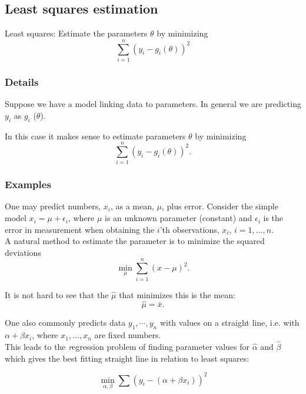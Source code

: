 \documentclass[12pt,a4paper]{article}
\theoremstyle{regla}
\theoremstyle{remark}
\theoremstyle{definition}
\theoremstyle{nonumberbreak}
\begin{document}
\subsection{Least squares estimation}
\begin{fbox}
\begin{minipage}{0.97\textwidth}
Least squares:  Estimate the parameters $\theta$ by minimizing 
$$
\sum_{i=1}^{n}{(y_i - g_i (\theta))^2} 
$$

\end{minipage}
\end{fbox}
\subsubsection{Details}
Suppose we have a model linking data to parameters. In general we are predicting $y_i$ as $g_i$ ($\theta$).

In this case it makes sense to estimate parameters $\theta$ by minimizing 
$$
\sum_{i=1}^{n}{(y_i - g_i (\theta))^2} .
$$

\subsubsection{Examples}
\begin{xmpl}
One may predict numbers, $x_i$, as a mean, $\mu$, plus error.  Consider the simple
model $x_i = \mu + \epsilon_i$, where 
$\mu$ is an unknown parameter (constant) and $\epsilon_i$ is the error in measurement
when obtaining the $i$'th observations, $x_i$, $i=1,\ldots , n$.\\

A natural method to estimate the parameter 
is to minimize the squared deviations
$$
\min_{\mu} \sum_{i=1}^n \left (x - \mu \right )^2  .
$$

It is not hard to see that the $\hat{\mu}$ that minimizes this is the mean:
$$
\hat{ \mu} = \bar{x} .
$$
\end{xmpl}
\begin{xmpl}
One also commonly  predicts data $y_1 , \cdots ,y_n$ with values on a straight line, i.e. with $\alpha + \beta x_i$, where $x_1, \ldots , x_n$ are fixed numbers. \\

This leads to the {\emph regression problem} of finding parameter values for $\hat{\alpha}$ and $\hat{\beta}$ which gives the best fitting straight line in relation to least squares:

$$
\min_{\alpha,\beta} \sum \left ( y_i - ( \alpha + \beta x_i) \right ) ^2
$$ 
\end{xmpl}
\end{document}
